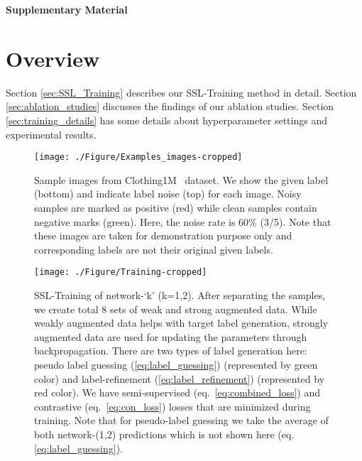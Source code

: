 \documentclass[10pt,twocolumn,letterpaper]{article}
\begin{document}
\newpage
{\small


}
\newpage



\textbf{\Large \centering Supplementary Material}
\section{Overview}
Section \ref{sec:SSL_Training} describes our SSL-Training method in detail. Section \ref{sec:ablation_studies} discusses the findings of our ablation studies. Section \ref{sec:training_details} has some details about hyperparameter settings and experimental results. 


\begin{figure*}[htb]
    \centering
    \texttt{[image: ./Figure/Examples\_images-cropped]}
    \caption{Sample images from Clothing1M~\cite{xiao2015learning} dataset. We show the given label (bottom) and indicate label noise (top) for each image. Noisy samples are marked as positive (red) while clean samples contain negative marks (green). Here, the noise rate is 60\% (3/5). Note that these images are taken for demonstration purpose only and corresponding labels are not their original given labels. }
    \label{fig:examples}
\end{figure*}

\begin{figure*}[htb]
\centering
\texttt{[image: ./Figure/Training-cropped]}
\caption{SSL-Training of network-`k' (k=1,2). After separating the samples, we create total 8 sets of weak and strong augmented data. While weakly augmented data helps with target label generation, strongly augmented data are used for updating the parameters through backpropagation. There are two types of label generation here: pseudo label guessing (\ref{eq:label_guessing})  (represented by green color) and label-refinement (\ref{eq:label_refinement}) (represented by red color). We have semi-supervised (eq.~\ref{eq:combined_loss}) and contrastive (eq.~\ref{eq:con_loss}) losses that are minimized during training. Note that for pseudo-label guessing we take the average of both network-(1,2) predictions which is not shown here (eq. \ref{eq:label_guessing}).}
\label{fig:framework_sup}
\end{figure*}
\end{document}
